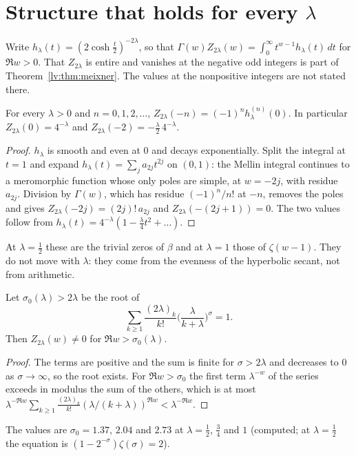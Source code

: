 \section{Structure that holds for every $\lambda$}\label{ml:sec:structure}
Write $h_\lambda(t)=(2\cosh\frac t2)^{-2\lambda}$, so that $\Gamma(w)Z_{2\lambda}(w)=\int_0^\infty t^{w-1}h_\lambda(t)\,dt$ for $\Re w>0$. That $Z_{2\lambda}$ is entire and vanishes at the negative odd integers is part of Theorem~\ref{lv:thm:meixner}. The values at the nonpositive integers are not stated there.
\begin{theorem}\label{ml:thm:trivial}
For every $\lambda>0$ and $n=0,1,2,\dots$, $Z_{2\lambda}(-n)=(-1)^nh_\lambda^{(n)}(0)$. In particular $Z_{2\lambda}(0)=4^{-\lambda}$ and $Z_{2\lambda}(-2)=-\frac\lambda2\,4^{-\lambda}$.
\end{theorem}
\begin{proof}
$h_\lambda$ is smooth and even at $0$ and decays exponentially. Split the integral at $t=1$ and expand $h_\lambda(t)=\sum_ja_{2j}t^{2j}$ on $(0,1)$: the Mellin integral continues to a meromorphic function whose only poles are simple, at $w=-2j$, with residue $a_{2j}$. Division by $\Gamma(w)$, which has residue $(-1)^n/n!$ at $-n$, removes the poles and gives $Z_{2\lambda}(-2j)=(2j)!\,a_{2j}$ and $Z_{2\lambda}(-(2j+1))=0$. The two values follow from $h_\lambda(t)=4^{-\lambda}(1-\frac{\lambda}{4}t^2+\dots)$.
\end{proof}
At $\lambda=\frac12$ these are the trivial zeros of $\beta$ and at $\lambda=1$ those of $\zeta(w-1)$. They do not move with $\lambda$: they come from the evenness of the hyperbolic secant, not from arithmetic.
\begin{theorem}\label{ml:thm:right}
Let $\sigma_0(\lambda)>2\lambda$ be the root of
\[\sum_{k\ge1}\frac{(2\lambda)_k}{k!}\Big(\frac{\lambda}{k+\lambda}\Big)^{\sigma}=1.\]
Then $Z_{2\lambda}(w)\ne0$ for $\Re w>\sigma_0(\lambda)$.
\end{theorem}
\begin{proof}
The terms are positive and the sum is finite for $\sigma>2\lambda$ and decreases to $0$ as $\sigma\to\infty$, so the root exists. For $\Re w>\sigma_0$ the first term $\lambda^{-w}$ of the series exceeds in modulus the sum of the others, which is at most $\lambda^{-\Re w}\sum_{k\ge1}\frac{(2\lambda)_k}{k!}(\lambda/(k+\lambda))^{\Re w}<\lambda^{-\Re w}$.
\end{proof}
The values are $\sigma_0=1.37$, $2.04$ and $2.73$ at $\lambda=\frac12$, $\frac34$ and $1$ (computed; at $\lambda=\frac12$ the equation is $(1-2^{-\sigma})\zeta(\sigma)=2$).

